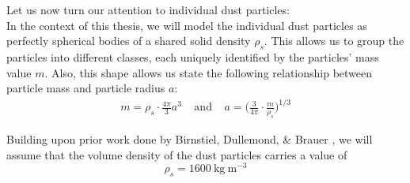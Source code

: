 
    Let us now turn our attention to individual dust particles: \\

    In the context of this thesis, we will model the individual dust particles as perfectly 
    spherical bodies of a shared solid density $\rho_s$. This allows us to group the particles 
    into different classes, each uniquely identified by the particles' mass value $m$.
    Also, this shape allows us state the following relationship between particle mass and 
    particle radius $a$:
    \begin{align}
        m
            =\rho_s \cdot \frac{4\pi}{3}a^3
        \ \ \ \ \ \text{and}\ \ \ \ \
        a
            =\bigg(\frac{3}{4\pi} \cdot \frac{m}{\rho_s}\bigg)^{1/3}
    \end{align}

    Building upon prior work done by Birnstiel, Dullemond, \& Brauer %
    \cite{birnstiel_dullemond_brauer_2010}, we will assume that the volume density of the dust 
    particles carries a value of
    $$\rho_s=\SI{1600}{\kilogram\ \meter^{-3}}$$

